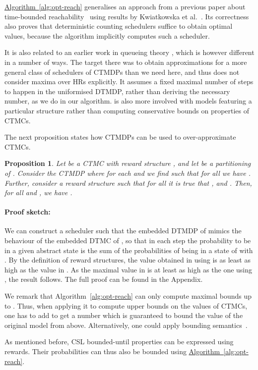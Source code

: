 \documentclass[10pt,twocolumn]{article}
\newenvironment{proofsketch}{\paragraph{Proof sketch:}}{\hfill}
\newtheorem{proposition}{Proposition}
\newcommand{\refalg}[1]{\texorpdfstring{\hyperref[alg:#1]{Algorithm~\ref*{alg:#1}}}{Algorithm~\ref*{alg:#1}}}
\begin{document}
\refalg{opt-reach} generalises an approach from a previous paper about
time-bounded reachability~\cite{BaierHKH05} using results by
Kwiatkowska et al.~\cite{KwiatkowskaNP06}. Its correctness also
proves that deterministic counting schedulers suffice to obtain
optimal values, because the algorithm implicitly computes such a
scheduler.

It is also related to an earlier work in queueing theory
\cite{Lippman76}, which is however different in a number of ways. The
target there was to obtain approximations for a more general class of
schedulers of CTMDPs than we need here, and thus does not consider
maxima over HRs explicitly. It assumes a fixed maximal number of steps
to happen in the uniformised DTMDP, rather than deriving the necessary
number, as we do in our algorithm. \cite{Lippman76} is also more
involved with models featuring a particular structure rather than
computing conservative bounds on properties of CTMCs.

The next proposition states how CTMDPs can be used to over-approximate
CTMCs.
\begin{proposition}
  \label{pro:corr-abs}
Let  be a CTMC with reward structure
  , and let  be a partitioning
  of . Consider the CTMDP 
  where for each  and 
  we find  such that for all  we have
  .
  Further, consider a reward
  structure  such that for all 
  it is true that , and . Then, for all 
  and , we have .
\end{proposition}
\begin{proofsketch}
  We can construct a scheduler  such that the embedded DTMDP
  of  mimics the behaviour of the embedded DTMC of
  , so that in each step the probability to be in a given
  abstract state  is the sum of the probabilities of being in
  a state  of  with .
  By the definition of reward structures, the value obtained in
   using  is as least as high as the value in
  .
  As the maximal value in  is at least as high as the one
  using , the result follows.
\end{proofsketch}
The full proof can be found in the Appendix.

We remark that Algorithm~\ref{alg:opt-reach} can only compute maximal bounds up to .
Thus, when applying it to compute upper bounds on the values of CTMCs, one has to add  
to get a number which is guaranteed to bound the value of the original model from above.
Alternatively, one could apply bounding semantics~\cite{ZhaoC13}.

As mentioned before, CSL bounded-until properties can be expressed
using rewards. Their probabilities can thus also be bounded using
\refalg{opt-reach}.
\end{document}
